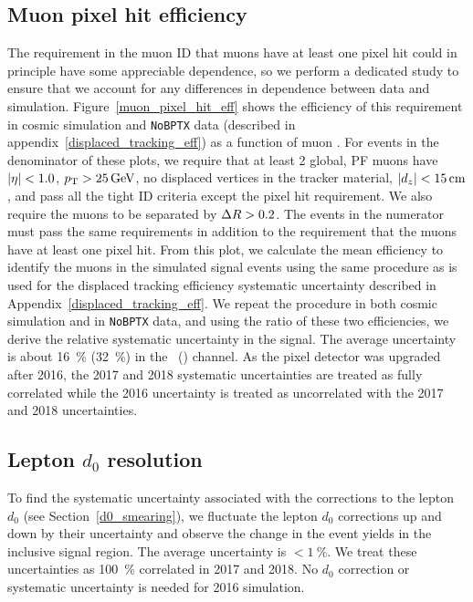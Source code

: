 \subsection{Muon pixel hit efficiency}
The requirement in the muon ID that muons have at least one pixel hit could in principle have some appreciable \ad dependence, so we perform a dedicated study to ensure that we account for any differences in \ad dependence between data and simulation. Figure~\ref{muon_pixel_hit_eff} shows the efficiency of this requirement in cosmic simulation and \texttt{NoBPTX} data (described in appendix~\ref{displaced_tracking_eff}) as a function of muon \ad. For events in the denominator of these plots, we require  that at least 2 global, PF muons have $\lvert \eta \rvert<1.0$, $\pt>\SI{25}{\GeV}$, no displaced vertices in the tracker material, $\abs{d_z}<\SI{15}{\cm}$, and pass all the tight ID criteria except the pixel hit requirement. We also require the muons to be separated by $\Delta R>0.2$. The events in the numerator must pass the same requirements in addition to the requirement that the muons have at least one pixel hit. From this plot, we calculate the mean efficiency to identify the muons in the simulated signal events using the same procedure as is used for the displaced tracking efficiency systematic uncertainty described in Appendix~\ref{displaced_tracking_eff}. We repeat the procedure in both cosmic simulation and in \texttt{NoBPTX} data, and using the ratio of these two efficiencies, we derive the relative systematic uncertainty in the signal. The average uncertainty is about \SI{16}{\percent} (\SI{32}{\percent}) in the \Pe\Pgm\ (\Pgm\Pgm) channel. As the pixel detector was upgraded after 2016, the 2017 and 2018 systematic uncertainties are treated as fully correlated while the 2016 uncertainty is treated as uncorrelated with the 2017 and 2018 uncertainties.



\subsection{Lepton $d_0$ resolution}
To find the systematic uncertainty associated with the corrections to the lepton $d_0$ (see Section~\ref{d0_smearing}), we fluctuate the lepton $d_0$ corrections up and down by their uncertainty and observe the change in the event yields in the inclusive signal region. The average uncertainty is $<\SI{1}{\percent}$. We treat these uncertainties as \SI{100}{\percent} correlated in 2017 and 2018. No $d_0$ correction or systematic uncertainty is needed for 2016 simulation.

\pagebreak